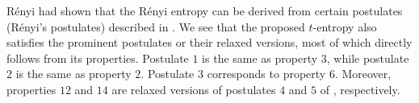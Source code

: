 \documentclass{article}
\newcommand{\bp}{\boldsymbol{p}}
\newcommand{\bq}{\boldsymbol{q}}
\begin{document}
R\'enyi had shown that the R\'enyi entropy can be derived from certain postulates (R\'enyi's postulates) described in \citep{renyi1961measures}. We see that the proposed $t$-entropy also satisfies the prominent postulates or their relaxed versions, most of which directly follows from its properties. Postulate $1$ is the same as property $3$, while postulate $2$ is the same as property $2$. Postulate $3$ corresponds to property $6$. Moreover, properties $12$ and $14$ are relaxed versions of postulates $4$ and $5$ of \citep{renyi1961measures}, respectively.
\end{document}
